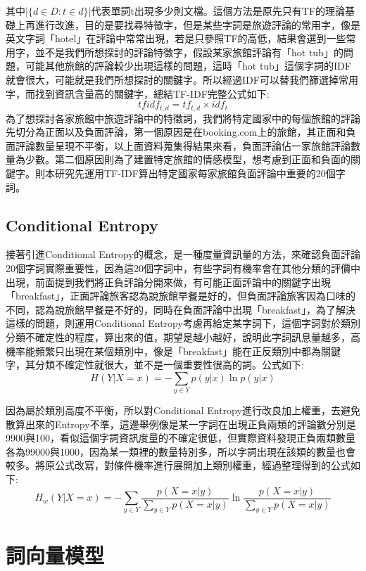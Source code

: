 \noindent 其中$|\{d\in D:t\in d\}|$代表單詞t出現多少則文檔。這個方法是原先只有TF的理論基礎上再進行改進，目的是要找尋特徵字，但是某些字詞是旅遊評論的常用字，像是英文字詞「hotel」在評論中常常出現，若是只參照TF的高低，結果會選到一些常用字，並不是我們所想探討的評論特徵字，假設某家旅館評論有「hot tub」的問題，可能其他旅館的評論較少出現這樣的問題，這時「hot tub」這個字詞的IDF就會很大，可能就是我們所想探討的關鍵字。所以經過IDF可以替我們篩選掉常用字，而找到資訊含量高的關鍵字，總結TF-IDF完整公式如下:
$$tfidf_{t,d} = tf_{t,d}\times idf_t$$
\noindent 為了想探討各家旅館中旅遊評論中的特徵詞，我們將特定國家中的每個旅館的評論先切分為正面以及負面評論，第一個原因是在booking.com上的旅館，其正面和負面評論數量呈現不平衡，以上面資料蒐集得結果來看，負面評論佔一家旅館評論數量為少數。第二個原因則為了建置特定旅館的情感模型，想考慮到正面和負面的關鍵字。則本研究先運用TF-IDF算出特定國家每家旅館負面評論中重要的20個字詞。
	
\subsection{Conditional Entropy}

	接著引進Conditional Entropy的概念，是一種度量資訊量的方法，來確認負面評論20個字詞實際重要性，因為這20個字詞中，有些字詞有機率會在其他分類的評價中出現，前面提到我們將正負評論分開來做，有可能正面評論中的關鍵字出現「breakfast」，正面評論旅客認為說旅館早餐是好的，但負面評論旅客因為口味的不同，認為說旅館早餐是不好的，同時在負面評論中出現「breakfast」，為了解決這樣的問題，則運用Conditional Entropy考慮再給定某字詞下，這個字詞對於類別分類不確定性的程度，算出來的值，期望是越小越好，說明此字詞訊息量越多，高機率能頻繁只出現在某個類別中，像是「breakfast」能在正反類別中都為關鍵字，其分類不確定性就很大，並不是一個重要性很高的詞。公式如下:
$$H(Y|X=x)=-\sum_{y\in Y}p(y|x)\ln p(y|x)$$

\noindent 因為屬於類別高度不平衡，所以對Conditional Entropy進行改良加上權重，去避免散算出來的Entropy不準，這邊舉例像是某一字詞在出現正負兩類的評論數分別是9900與100，看似這個字詞資訊度量的不確定很低，但實際資料發現正負兩類數量各為99000與1000，因為某一類裡的數量特別多，所以字詞出現在該類的數量也會較多。將原公式改寫，對條件機率進行展開加上類別權重，經過整理得到的公式如下:
$$H_w(Y|X=x)=-\sum_{y\in Y}\dfrac{p(X=x|y)}{\sum_{y\in Y}p(X=x|y)}\ln \dfrac{p(X=x|y)}{\sum_{y\in Y}p(X=x|y)}$$

\section{詞向量模型}

